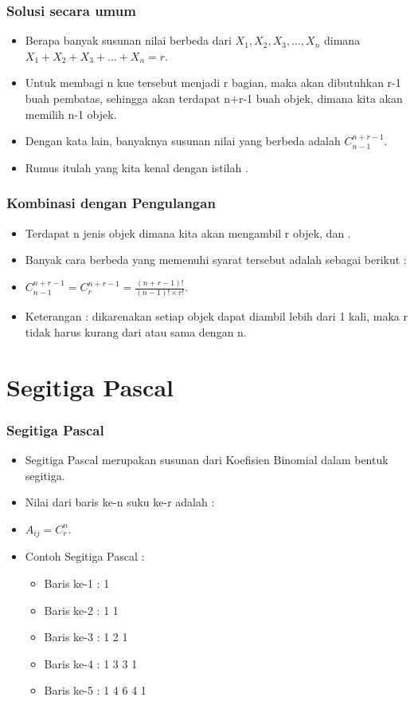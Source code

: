 \begin{frame}
\frametitle{Solusi secara umum}
\begin{itemize}
  \item Berapa banyak susunan nilai berbeda dari $X_{1}, X_{2}, X_{3}, ..., X_{n}$ dimana $X_{1} + X_{2} + X_{3} + ... + X_{n} = r$.
  \item Untuk membagi n kue tersebut menjadi r bagian, maka akan dibutuhkan r-1 buah pembatas, sehingga akan terdapat n+r-1 buah objek, dimana kita akan memilih n-1 objek.
  \item Dengan kata lain, banyaknya susunan nilai yang berbeda adalah $C^{n+r-1}_{n-1}$.
  \item Rumus itulah yang kita kenal dengan istilah .
\end{itemize}
\end{frame}

\begin{frame}
\frametitle{Kombinasi dengan Pengulangan}
\begin{itemize}
  \item Terdapat n jenis objek dimana kita akan mengambil r objek, dan .
  \item Banyak cara berbeda yang memenuhi syarat tersebut adalah sebagai berikut :
  \item $C^{n+r-1}_{n-1} = C^{n+r-1}_{r} = \frac{(n+r-1)!}{(n-1)! \times r!}$.
  \item Keterangan : dikarenakan setiap objek dapat diambil lebih dari 1 kali, maka r tidak harus kurang dari atau sama dengan n.
\end{itemize}
\end{frame}

\section{Segitiga Pascal}
\frame{\sectionpage}

\begin{frame}
\frametitle{Segitiga Pascal}
\begin{itemize}
  \item Segitiga Pascal merupakan susunan dari Koefisien Binomial dalam bentuk segitiga.
  \item Nilai dari baris ke-n suku ke-r adalah :
  \item $A_{ij} = C^{n}_{r}$.
  \item Contoh Segitiga Pascal :
  \begin{itemize} 
    \item Baris ke-1 : 1
    \item Baris ke-2 : 1 1
    \item Baris ke-3 : 1 2 1
    \item Baris ke-4 : 1 3 3 1
    \item Baris ke-5 : 1 4 6 4 1
  \end{itemize}
\end{itemize}
\end{frame}

